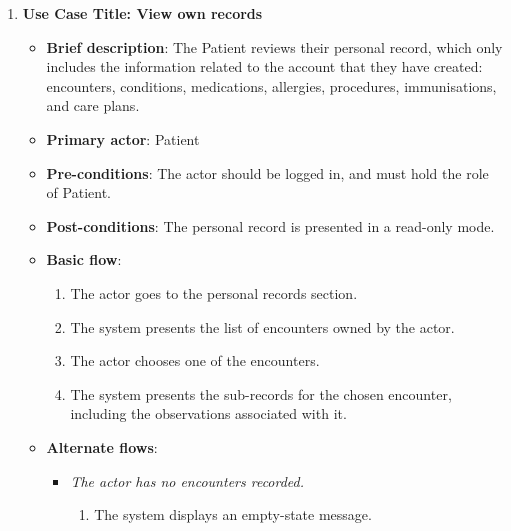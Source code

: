 \begin{enumerate}
\vspace{0.5em}

\item \textbf{Use Case Title: View own records}
\begin{itemize}
    \item \textbf{Brief description}: The Patient reviews their personal record, which only includes the information related to the account that they have created: encounters, conditions, medications, allergies, procedures, immunisations, and care plans.
    \item \textbf{Primary actor}: Patient
    \item \textbf{Pre-conditions}: The actor should be logged in, and must hold the role of Patient.
    \item \textbf{Post-conditions}: The personal record is presented in a read-only mode.
    \item \textbf{Basic flow}:
    \begin{enumerate}
        \item The actor goes to the personal records section.
        \item The system presents the list of encounters owned by the actor.
        \item The actor chooses one of the encounters.
        \item The system presents the sub-records for the chosen encounter, including the observations associated with it.
    \end{enumerate}
    \item \textbf{Alternate flows}:
    \begin{itemize}
        \item[2a.] \textit{The actor has no encounters recorded.}
        \begin{enumerate}
            \item The system displays an empty-state message.
        \end{enumerate}
    \end{itemize}
\end{itemize}

\end{enumerate}

